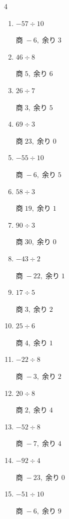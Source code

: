 \begin{multicols}{4}
\begin{enumerate}
        $商\; 60,\; 余り\; 0$

  \item $-57 \div 10$

        $商\; -6,\; 余り\; 3$

  \item $46 \div 8$

        $商\; 5,\; 余り\; 6$

  \item $26 \div 7$

        $商\; 3,\; 余り\; 5$

  \item $69 \div 3$

        $商\; 23,\; 余り\; 0$

  \item $-55 \div 10$

        $商\; -6,\; 余り\; 5$

  \item $58 \div 3$

        $商\; 19,\; 余り\; 1$

  \item $90 \div 3$

        $商\; 30,\; 余り\; 0$

  \item $-43 \div 2$

        $商\; -22,\; 余り\; 1$

  \item $17 \div 5$

        $商\; 3,\; 余り\; 2$

  \item $25 \div 6$

        $商\; 4,\; 余り\; 1$

  \item $-22 \div 8$

        $商\; -3,\; 余り\; 2$

  \item $20 \div 8$

        $商\; 2,\; 余り\; 4$

  \item $-52 \div 8$

        $商\; -7,\; 余り\; 4$

  \item $-92 \div 4$

        $商\; -23,\; 余り\; 0$

  \item $-51 \div 10$

        $商\; -6,\; 余り\; 9$


\end{enumerate}
\end{multicols}
